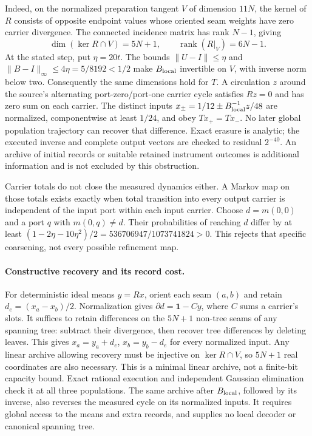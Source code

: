 Indeed, on the normalized preparation tangent $V$ of dimension $11N$,
the kernel of $R$ consists of opposite endpoint values whose oriented
seam weights have zero carrier divergence. The connected incidence matrix
has rank $N-1$, giving
\[
 \dim(\ker R\cap V)=5N+1,\qquad \operatorname{rank}(R|_V)=6N-1.
\]
At the stated step, put $\eta=20t$. The bounds
$\|U-I\|\leq\eta$ and $\|B-I\|_\infty\leq4\eta=5/8192<1/2$ make
$B_{\rm local}$ invertible on $V$, with inverse norm below two.
Consequently the same dimensions hold for $T$. A circulation $z$ around
the source's alternating port-zero/port-one carrier cycle satisfies $Rz=0$
and has zero sum on each carrier. The distinct inputs
$x_\pm=1/12\pm B_{\rm local}^{-1}z/48$ are normalized, componentwise
at least $1/24$, and obey $Tx_+=Tx_-$. No later global population trajectory
can recover that difference. Exact erasure is analytic; the executed
inverse and complete output vectors are checked to residual $2^{-40}$.
An archive of initial records or suitable retained instrument outcomes is
additional information and is not excluded by this obstruction.

Carrier totals do not close the measured dynamics either. A Markov map
on those totals exists exactly when total transition into every output
carrier is independent of the input port within each input carrier.
Choose $d=m(0,0)$ and a port $q$ with $m(0,q)\ne d$. Their probabilities
of reaching $d$ differ by at least
$(1-2\eta-10\eta^2)/2=536706947/1073741824>0$. This rejects that specific
coarsening, not every possible refinement map.

\paragraph{Constructive recovery and its record cost.}
For deterministic ideal means $y=Rx$, orient each seam $(a,b)$ and retain
$d_e=(x_a-x_b)/2$. Normalization gives $\partial d=\mathbf1-Cy$, where
$C$ sums a carrier's slots. It suffices to retain differences on the
$5N+1$ non-tree seams of any spanning tree: subtract their divergence,
then recover tree differences by deleting leaves. This gives
$x_a=y_a+d_e$, $x_b=y_b-d_e$ for every normalized input.
Any linear archive allowing recovery must be injective on
$\ker R\cap V$, so $5N+1$ real coordinates are also necessary.
This is a minimal linear archive, not a finite-bit capacity bound.
Exact rational execution and independent Gaussian elimination check it
at all three populations. The same archive after $B_{\rm local}$,
followed by its inverse, also reverses the measured cycle on its
normalized inputs. It requires global access to the means and extra
records, and supplies no local decoder or canonical spanning tree.

